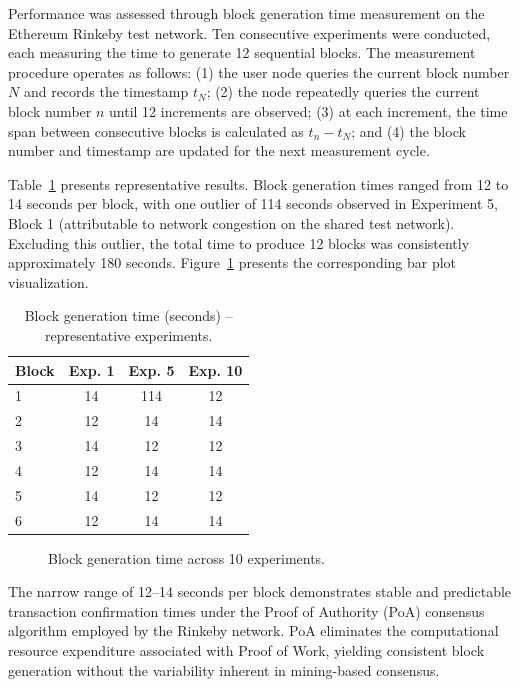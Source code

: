 \documentclass[AMA,LATO1COL]{WileyNJD-v2}
\begin{document}
Performance was assessed through block generation time measurement on the Ethereum Rinkeby test network. Ten consecutive experiments were conducted, each measuring the time to generate 12 sequential blocks. The measurement procedure operates as follows: (1) the user node queries the current block number $N$ and records the timestamp $t_N$; (2) the node repeatedly queries the current block number $n$ until 12 increments are observed; (3) at each increment, the time span between consecutive blocks is calculated as $t_n - t_N$; and (4) the block number and timestamp are updated for the next measurement cycle.

Table~\ref{tab:performance} presents representative results. Block generation times ranged from 12 to 14 seconds per block, with one outlier of 114 seconds observed in Experiment 5, Block 1 (attributable to network congestion on the shared test network). Excluding this outlier, the total time to produce 12 blocks was consistently approximately 180 seconds. Figure~\ref{fig:performance} presents the corresponding bar plot visualization.

\begin{table}[!ht]
\caption{Block generation time (seconds) -- representative experiments.}\label{tab:performance}
\begin{tabular*}{\columnwidth}{@{\extracolsep\fill}lccc@{}}
\toprule
Block & Exp. 1 & Exp. 5 & Exp. 10 \\
\midrule
1 & 14 & 114 & 12 \\
2 & 12 & 14 & 14 \\
3 & 14 & 12 & 12 \\
4 & 12 & 14 & 14 \\
5 & 14 & 12 & 12 \\
6 & 12 & 14 & 14 \\
\bottomrule
\end{tabular*}
\end{table}

\begin{figure}[!ht]
\centering
{}
\caption{Block generation time across 10 experiments.}\label{fig:performance}
\end{figure}

The narrow range of 12--14 seconds per block demonstrates stable and predictable transaction confirmation times under the Proof of Authority (PoA) consensus algorithm employed by the Rinkeby network. PoA eliminates the computational resource expenditure associated with Proof of Work, yielding consistent block generation without the variability inherent in mining-based consensus.
\end{document}
